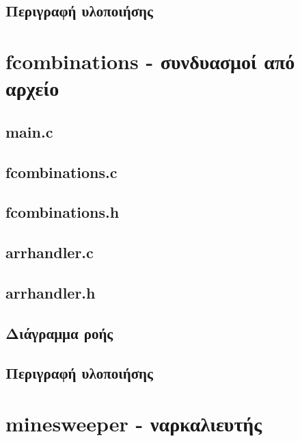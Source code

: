 \documentclass{article}
\begin{document}
    \subsection{Περιγραφή υλοποιήσης}


\section{fcombinations - συνδυασμοί από αρχείο}

    \subsection{main.c}
        

    \subsection{fcombinations.c}
        

    \subsection{fcombinations.h}
        

    \subsection{arrhandler.c}
        

    \subsection{arrhandler.h}
         

    \subsection{Διάγραμμα ροής}

    \subsection{Περιγραφή υλοποιήσης}


\section{minesweeper - ναρκαλιευτής}
\end{document}
